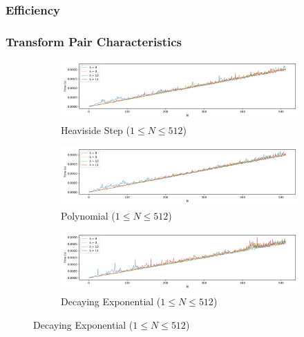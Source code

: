 \documentclass[a4paper]{report}
\begin{document}
\subsubsection{Efficiency}

\subsubsection{Transform Pair Characteristics}

\begin{figure}[H]
    \begin{subfigure}{1\linewidth}
      \includegraphics[width=\linewidth]{images/abate_whitt/heaviside_step_speeds.png}
      \caption{Heaviside Step ($1 \leq N \leq 512$)}
    \end{subfigure}
    
    \medskip
    
    \begin{subfigure}{1\linewidth}
      \includegraphics[width=\linewidth]{images/abate_whitt/polynomial_speeds.png}
      \caption{Polynomial ($1 \leq N \leq 512$)}
    \end{subfigure}
    
    \medskip
    
    \begin{subfigure}{1\linewidth}
      \includegraphics[width=\linewidth]{images/abate_whitt/decay_exp_speeds.png}
      \caption{Decaying Exponential ($1 \leq N \leq 512$)}
    \end{subfigure}
    

\end{figure}
\end{document}
